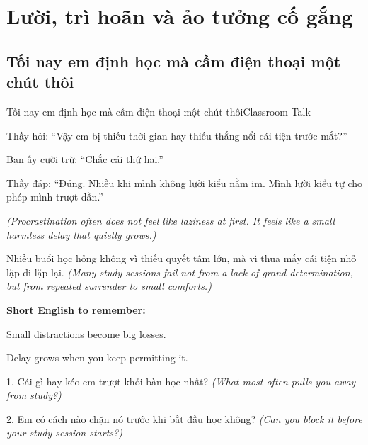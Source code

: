 \chapter{Lười, trì hoãn và ảo tưởng cố gắng}

\section{Tối nay em định học mà cầm điện thoại một chút thôi}
\begin{truyen}{Tối nay em định học mà cầm điện thoại một chút thôi}{Classroom Talk}

Thầy hỏi: ``Vậy em bị thiếu thời gian hay thiếu thắng nổi cái tiện trước mắt?''

Bạn ấy cười trừ: ``Chắc cái thứ hai.''

Thầy đáp: ``Đúng. Nhiều khi mình không lười kiểu nằm im. Mình lười kiểu tự cho phép mình trượt dần.''

\textit{(Procrastination often does not feel like laziness at first. It feels like a small harmless delay that quietly grows.)}
\end{truyen}

\begin{baihoc}
Nhiều buổi học hỏng không vì thiếu quyết tâm lớn, mà vì thua mấy cái tiện nhỏ lặp đi lặp lại.
\textit{(Many study sessions fail not from a lack of grand determination, but from repeated surrender to small comforts.)}
\end{baihoc}

\begin{ghinhoanh}
\textbf{Short English to remember:}

Small distractions become big losses.

Delay grows when you keep permitting it.
\end{ghinhoanh}

\begin{tuhocnhanh}
1. Cái gì hay kéo em trượt khỏi bàn học nhất? \textit{(What most often pulls you away from study?)}

2. Em có cách nào chặn nó trước khi bắt đầu học không? \textit{(Can you block it before your study session starts?)}
\end{tuhocnhanh}
\ngancach

